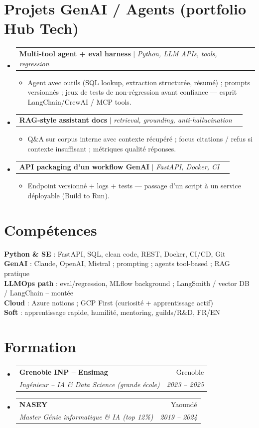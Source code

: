 \documentclass[a4paper,10.5pt]{article}
\makeatletter
\newcommand{\resumeItem}[1]{\item\small{#1}}
\newcommand{\resumeSubheading}[4]{\vspace{2.5pt}\item\begin{tabular*}{0.97\textwidth}[t]{l@{\extracolsep{\fill}}r}\textbf{#1}&{#2}\\\textit{\small #3}&\textit{\small #4}\\\end{tabular*}\vspace{1pt}}
\newcommand{\resumeProjectHeading}[2]{\vspace{1.5pt}\item\begin{tabular*}{0.97\textwidth}{l@{\extracolsep{\fill}}r}\small #1&#2\\\end{tabular*}\vspace{1pt}}
\newcommand{\resumeSubHeadingListStart}{\begin{itemize}[leftmargin=0.08in,label={}]}
\newcommand{\resumeSubHeadingListEnd}{\end{itemize}}
\makeatother
\begin{document}
\section{Projets GenAI / Agents (portfolio Hub Tech)}
\resumeSubHeadingListStart
  \resumeProjectHeading{\textbf{Multi-tool agent + eval harness} $|$ \emph{Python, LLM APIs, tools, regression}}{}
  \begin{itemize}
    \resumeItem{Agent avec outils (SQL lookup, extraction structur\'ee, r\'esum\'e) ; prompts versionn\'es ; jeux de tests de non-r\'egression avant confiance --- esprit LangChain/CrewAI / MCP tools.}
  \end{itemize}
  \resumeProjectHeading{\textbf{RAG-style assistant docs} $|$ \emph{retrieval, grounding, anti-hallucination}}{}
  \begin{itemize}
    \resumeItem{Q\&A sur corpus interne avec contexte r\'ecup\'er\'e ; focus citations / refus si contexte insuffisant ; m\'etriques qualit\'e r\'eponses.}
  \end{itemize}
  \resumeProjectHeading{\textbf{API packaging d'un workflow GenAI} $|$ \emph{FastAPI, Docker, CI}}{}
  \begin{itemize}
    \resumeItem{Endpoint versionn\'e + logs + tests --- passage d'un script \`a un service d\'eployable (Build to Run).}
  \end{itemize}
\resumeSubHeadingListEnd

\section{Comp\'etences}
\begin{itemize}[leftmargin=0.08in,label={}]\small{\item{
\textbf{Python \& SE} : FastAPI, SQL, clean code, REST, Docker, CI/CD, Git \\
\textbf{GenAI} : Claude, OpenAI, Mistral ; prompting ; agents tool-based ; RAG pratique \\
\textbf{LLMOps path} : eval/regression, MLflow background ; LangSmith / vector DB / LangChain -- mont\'ee \\
\textbf{Cloud} : Azure notions ; GCP First (curiosit\'e + apprentissage actif) \\
\textbf{Soft} : apprentissage rapide, humilit\'e, mentoring, guilds/R\&D, FR/EN
}}\end{itemize}

\section{Formation}
\resumeSubHeadingListStart
  \resumeSubheading{Grenoble INP -- Ensimag}{Grenoble}{Ing\'enieur -- IA \& Data Science (grande \'ecole)}{2023 -- 2025}
  \resumeSubheading{NASEY}{Yaound\'e}{Master G\'enie informatique \& IA (top 12\%)}{2019 -- 2024}
\resumeSubHeadingListEnd
\end{document}
